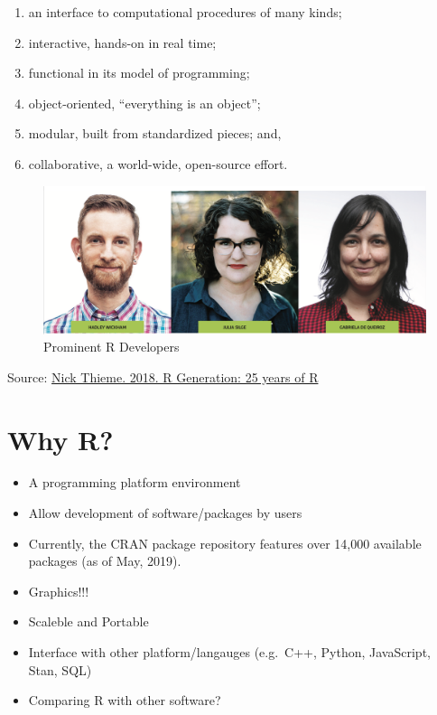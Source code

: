 \documentclass[]{book}
\providecommand{\tightlist}{%
  \setlength{\itemsep}{0pt}\setlength{\parskip}{0pt}}
\begin{document}
\begin{enumerate}
\def\labelenumi{\arabic{enumi}.}
\tightlist
\item
  an interface to computational procedures of many kinds;
\item
  interactive, hands-on in real time;
\item
  functional in its model of programming;
\item
  object-oriented, ``everything is an object'';
\item
  modular, built from standardized pieces; and,
\item
  collaborative, a world-wide, open-source effort.
\end{enumerate}

\begin{figure}
\includegraphics[width=1\linewidth]{Rdevelopers} \caption{Prominent R Developers}\label{fig:Rdevelopers}
\end{figure}

Source: \href{https://rss.onlinelibrary.wiley.com/doi/10.1111/j.1740-9713.2018.01169.x}{Nick Thieme. 2018. R Generation: 25 years of R}

\hypertarget{why-r}{%
\section{Why R?}\label{why-r}}

\begin{itemize}
\tightlist
\item
  A programming platform environment
\item
  Allow development of software/packages by users
\item
  Currently, the CRAN package repository features over 14,000 available packages (as of May, 2019).
\item
  Graphics!!!
\item
  Scaleble and Portable
\item
  Interface with other platform/langauges (e.g.~C++, Python, JavaScript, Stan, SQL)
\item
  Comparing R with other software?
\end{itemize}
\end{document}
